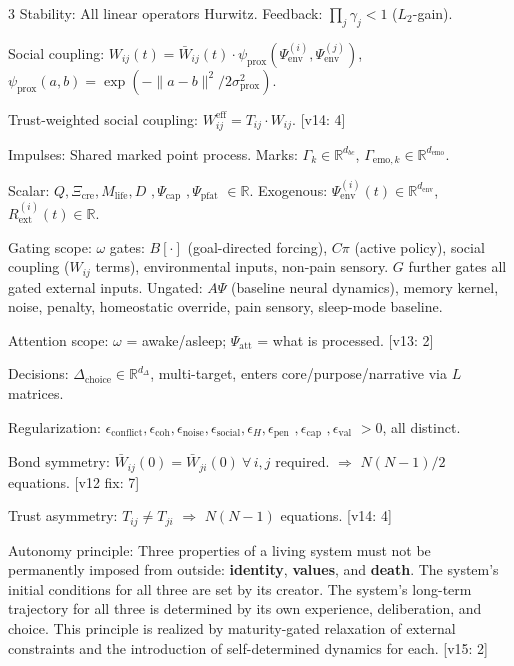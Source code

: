 \documentclass[8pt,landscape]{extarticle}
\newcommand{\fix}[1]{\textcolor{fixcolor}{#1}}
\newcommand{\fixlabel}[1]{\textcolor{fixcolor}{\textsf{\scriptsize[v12 fix: #1]}}}
\newcommand{\vnew}[1]{\textcolor{v13color}{#1}}
\newcommand{\vnewlabel}[1]{\textcolor{v13color}{\textsf{\scriptsize[v13: #1]}}}
\newcommand{\vfour}[1]{\textcolor{v14color}{#1}}
\newcommand{\vfourlabel}[1]{\textcolor{v14color}{\textsf{\scriptsize[v14: #1]}}}
\newcommand{\vfive}[1]{\textcolor{v15color}{#1}}
\newcommand{\vfivelabel}[1]{\textcolor{v15color}{\textsf{\scriptsize[v15: #1]}}}
\begin{document}
\begin{multicols}{3}
Stability: All linear operators Hurwitz. Feedback: $\prod_j \gamma_j < 1$ ($L_2$-gain).

Social coupling: $W_{ij}(t) = \bar{W}_{ij}(t) \cdot \psi_{\mathrm{prox}}(\Psi^{(i)}_{\mathrm{env}}, \Psi^{(j)}_{\mathrm{env}})$, \; $\psi_{\mathrm{prox}}(a,b) = \exp(-\|a - b\|^2 / 2\sigma^2_{\mathrm{prox}})$.

\vfour{Trust-weighted social coupling: $W^{\mathrm{eff}}_{ij} = T_{ij} \cdot W_{ij}$.} \vfourlabel{4}

Impulses: Shared marked point process. Marks: $\Gamma_k \in \mathbb{R}^{d_{bc}}$, $\Gamma_{\mathrm{emo},k} \in \mathbb{R}^{d_{\mathrm{emo}}}$.

Scalar: $Q, \Xi_{\mathrm{cre}}, M_{\mathrm{life}}, D$ \vnew{$, \Psi_{\mathrm{cap}}$} \vfour{$, \Psi_{\mathrm{pfat}}$} $\in \mathbb{R}$.
Exogenous: $\Psi^{(i)}_{\mathrm{env}}(t) \in \mathbb{R}^{d_{\mathrm{env}}}$, $R^{(i)}_{\mathrm{ext}}(t) \in \mathbb{R}$.

Gating scope: $\omega$ gates: $B[\cdot]$ (goal-directed forcing), $C\pi$ (active policy), social coupling ($W_{ij}$ terms), environmental inputs, non-pain sensory. $G$ further gates all gated external inputs. Ungated: $A\Psi$ (baseline neural dynamics), memory kernel, noise, penalty, homeostatic override, pain sensory, sleep-mode baseline.

\vnew{Attention scope: $\omega$ = awake/asleep; $\Psi_{\mathrm{att}}$ = what is processed.} \vnewlabel{2}

Decisions: $\Delta_{\mathrm{choice}} \in \mathbb{R}^{d_\Delta}$, multi-target, enters core/purpose/narrative via $L$ matrices.

Regularization: $\epsilon_{\mathrm{conflict}}, \epsilon_{\mathrm{coh}}, \epsilon_{\mathrm{noise}}, \epsilon_{\mathrm{social}}, \epsilon_H, \epsilon_{\mathrm{pen}}$ \vnew{$, \epsilon_{\mathrm{cap}}$} \vfive{$, \epsilon_{\mathrm{val}}$} $> 0$, all distinct.

\fix{Bond symmetry: $\bar{W}_{ij}(0) = \bar{W}_{ji}(0)\ \forall\,i,j$ required. $\Rightarrow$ $N(N{-}1)/2$ equations.} \fixlabel{7}

\vfour{Trust asymmetry: $T_{ij} \ne T_{ji}$ $\Rightarrow$ $N(N{-}1)$ equations.} \vfourlabel{4}

\vfive{Autonomy principle: Three properties of a living system must not be permanently imposed from outside: \textbf{identity}, \textbf{values}, and \textbf{death}. The system's initial conditions for all three are set by its creator. The system's long-term trajectory for all three is determined by its own experience, deliberation, and choice. This principle is realized by maturity-gated relaxation of external constraints and the introduction of self-determined dynamics for each.} \vfivelabel{2}


\end{multicols}
\end{document}
